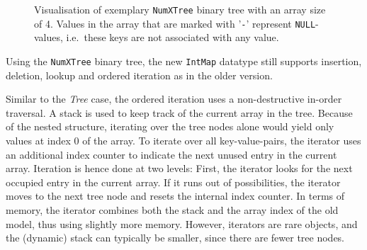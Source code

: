 \documentclass[]{ceurart}
\begin{document}
\begin{figure}[h!]
  \centering
  \caption{
    Visualisation of exemplary \texttt{NumXTree} binary tree with an
    array size of 4. Values in the array that are marked with
    '\texttt{-}' represent \texttt{NULL}-values, i.e.\ these keys
    are not associated with any value.
    }
  \label{fig:NumXTree}
\end{figure}

Using the \texttt{NumXTree} binary tree, the new \texttt{IntMap}
datatype still supports insertion, deletion, lookup and ordered
iteration as in the older version.

Similar to the \emph{Tree} case, the ordered iteration uses a
non-destructive in-order traversal. A stack is used to keep track of
the current array in the tree. Because of the nested structure,
iterating over the tree nodes alone would yield only values at index 0
of the array. To iterate over all key-value-pairs, the iterator uses
an additional index counter to indicate the next unused entry in the
current array. Iteration is hence done at two levels: First, the
iterator looks for the next occupied entry in the current array. If it
runs out of possibilities, the iterator moves to the next tree node
and resets the internal index counter. In terms of memory, the
iterator combines both the stack and the array index of the old model,
thus using slightly more memory. However, iterators are rare objects,
and the (dynamic) stack can typically be smaller, since there are
fewer tree nodes.
\end{document}
